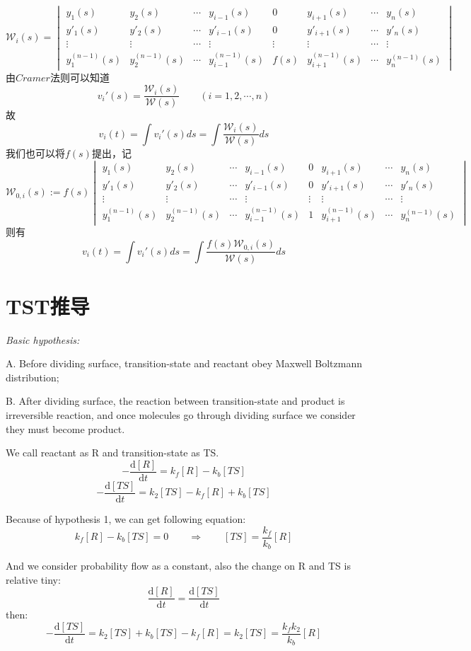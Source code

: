\[
\mathcal{W}_i(s)=
\begin{vmatrix}
    y_1(s) & y_2(s) & \cdots & y_{i-1}(s) & 0 & y_{i+1}(s) & \cdots & y_n(s) \\
    y'_1(s) & y'_2(s) & \cdots & y'_{i-1}(s) & 0 & y'_{i+1}(s) & \cdots & y'_n(s) \\
    \vdots & \vdots & \cdots & \vdots & \vdots & \vdots & \cdots & \vdots \\
    y^{(n-1)}_1(s) & y^{(n-1)}_2(s) & \cdots & y^{(n-1)}_{i-1}(s) & f(s) & y^{(n-1)}_{i+1}(s) & \cdots & y^{(n-1)}_n(s)
\end{vmatrix} 
\]
由$Cramer$法则可以知道
\[v_i'(s)=\frac{\mathcal{W}_i(s)}{\mathcal{W}(s)} \qquad (i=1,2,\cdots,n)\]
故
\[v_i(t)=\int v_i'(s)ds=\int \frac{\mathcal{W}_i(s)}{\mathcal{W}(s)}ds\]
我们也可以将$f(s)$提出，记
\[
\mathcal{W}_{0,i}(s):=f(s)
\begin{vmatrix}
    y_1(s) & y_2(s) & \cdots & y_{i-1}(s) & 0 & y_{i+1}(s) & \cdots & y_n(s) \\
    y'_1(s) & y'_2(s) & \cdots & y'_{i-1}(s) & 0 & y'_{i+1}(s) & \cdots & y'_n(s) \\
    \vdots & \vdots & \cdots & \vdots & \vdots & \vdots & \cdots & \vdots \\
    y^{(n-1)}_1(s) & y^{(n-1)}_2(s) & \cdots & y^{(n-1)}_{i-1}(s) & 1 & y^{(n-1)}_{i+1}(s) & \cdots & y^{(n-1)}_n(s)
\end{vmatrix} 
\]
则有
\[v_i(t)=\int v_i'(s)ds=\int \frac{f(s)\mathcal{W}_{0,i}(s)}{\mathcal{W}(s)}ds\]

\section{TST推导}\textit{Basic hypothesis:}

A. Before dividing surface, transition-state and reactant obey Maxwell Boltzmann distribution;

B. After dividing surface, the reaction between transition-state and product is irreversible reaction, and once molecules go through dividing surface we consider they must become product.

We call reactant as R and transition-state as TS.
\[-\frac{\mathrm{d} {[R]}}{\mathrm{d} t} = k_f[R]-k_b[TS] \tag{a}\]
\[-\frac{\mathrm{d} {[TS]}}{\mathrm{d} t} = k_2[TS]-k_f[R]+k_b[TS] \tag{b}\]

Because of hypothesis 1, we can get following equation:
\[k_f[R]-k_b[TS]=0 \qquad \Rightarrow \qquad [TS]=\frac{k_f}{k_b}[R]\]

And we consider probability flow as a constant, also the change on R and TS is relative tiny:
\[\frac{\mathrm{d} {[R]}}{\mathrm{d} t} = \frac{\mathrm{d} {[TS]}}{\mathrm{d} t}\]
then:
\[-\frac{\mathrm{d} {[TS]}}{\mathrm{d} t} = k_2[TS]+k_b[TS]-k_f[R]=k_2[TS]=\frac{k_fk_2}{k_b}[R]\]

